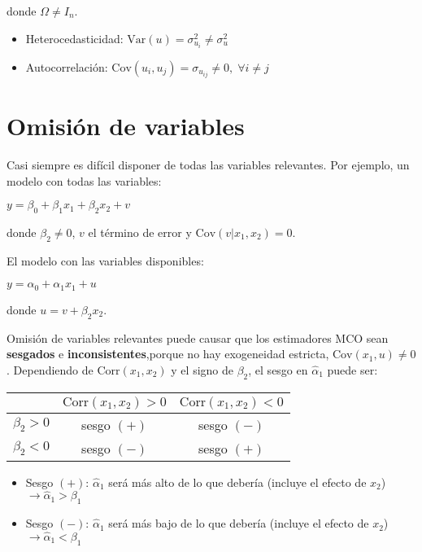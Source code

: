 \documentclass[10pt, a4paper, landscape]{article}
\newcommand{\Var}{\mathrm{Var}}
\newcommand{\Cov}{\mathrm{Cov}}
\newcommand{\Corr}{\mathrm{Corr}}
\begin{document}
\begin{multicols}{3}
		\quad donde $\Omega \neq I_{n}$.
		
		\begin{itemize}[leftmargin=*]
			\item Heterocedasticidad: $\Var(u) = \sigma^{2}_{u_i} \neq \sigma^{2}_{u}$
			\item Autocorrelación: $\Cov(u_{i}, u_{j}) = \sigma_{u_{ij}} \neq 0, \; \forall i \neq j$
		\end{itemize}
		
		\section*{Omisión de variables}
		
		Casi siempre es difícil disponer de todas las variables relevantes. Por ejemplo, un modelo con todas las variables:
		
		\begin{center}
			$y = \beta_{0} + \beta_{1} x_{1} + \beta_{2} x_{2} + v$
		\end{center}
		
		\quad donde $\beta_{2} \neq 0$, $v$ el término de error y $\Cov(v|x_{1},x_{2}) = 0$.
		
		El modelo con las variables disponibles:
		
		\begin{center}
			$y = \alpha_{0} + \alpha_{1} x_{1} + u$
		\end{center}
		
		\quad donde $u = v + \beta_{2} x_{2}$.
		
		Omisión de variables relevantes puede causar que los estimadores MCO sean \textbf{sesgados} e \textbf{inconsistentes},porque no hay exogeneidad estricta, $\Cov(x_{1}, u) \neq 0$. Dependiendo de $\Corr(x_{1}, x_{2})$ y el signo de $\beta_{2}$, el sesgo en $\hat{\alpha}_{1}$ puede ser:
		
		\begin{center}
			\begin{tabular}{ c | c c }
				                & $\Corr(x_{1}, x_{2}) > 0$ & $\Corr(x_{1}, x_{2}) < 0$ \\ \hline
				$\beta_{2} > 0$ & sesgo $(+)$               & sesgo $(-)$               \\
				$\beta_{2} < 0$ & sesgo $(-)$               & sesgo $(+)$
			\end{tabular}
		\end{center}
		
		\begin{itemize}[leftmargin=*]
			\item Sesgo $(+)$: $\hat{\alpha}_{1}$ será más alto de lo que debería (incluye el efecto de $x_{2}$) $\rightarrow \hat{\alpha}_{1} > \beta_{1}$
			\item Sesgo $(-)$: $\hat{\alpha}_{1}$ será más bajo de lo que debería (incluye el efecto de $x_{2}$) $\rightarrow \hat{\alpha}_{1} < \beta_{1}$
		\end{itemize}
		

\end{multicols}
\end{document}
